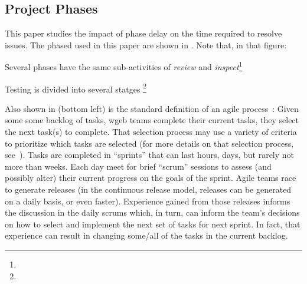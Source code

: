 \subsection{Project Phases}
This paper studies the impact of phase delay on the time required to resolve issues.
The phased used in this paper are shown in . Note that, in that figure:
\bi 
\item
Several  phases have the same  sub-activities of {\em review} and {\em inspect}\footnote{}
\item Testing is divided into several statges \footnote{}
\ei 

Also shown in  (bottom left) is the standard definition of an agile process~\cite{boehmturner03}:
Given some
some backlog of tasks, wgeb teams complete their current tasks, they select the next task(s) to complete. That selection process may use a variety of criteria
to prioritize which  tasks are selected (for more details on that selection process, see~\cite{me09j,port08,boehmturner03}). Tasks are completed in ``sprints'' that can last hours,
days, but rarely not more than weeks. Each day meet for brief ``scrum'' sessions to assess (and possibly alter) their current progress on the goals of the sprint.  
Agile teams race to generate releases
(in the continuous release model, releases can be generated on a daily basis, or even faster).  
Experience gained from those releases informs the discussion in the daily scrums which, in turn,
can inform the team's decisions on how to select and implement the next set of tasks for next sprint.
In fact, that experience can result in changing some/all of the tasks in the current backlog. 

